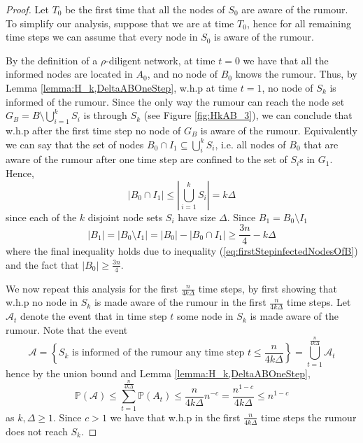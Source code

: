 
\begin{proof} 
	Let $T_0$ be the first time that all the nodes of $S_0$ are aware of the rumour. To simplify our analysis, suppose that we are at time $T_0$, hence for all remaining time steps we can assume that every node in $S_0$ is aware of the rumour. %

	By the definition of a $\rho$-diligent network, at time $t=0$  we have that all the informed nodes are located in $A_0$, and no node of $B_0$ knows the rumour. Thus, by Lemma \ref{lemma:H_k,DeltaABOneStep}, w.h.p at time $t = 1$, no node of $S_k$ is informed of the rumour. Since the only way the rumour can reach the node set $G_B = B \setminus \bigcup_{i=1}^k S_i$ is through $S_k$ (see Figure \ref{fig:HkAB_3}), we can conclude that w.h.p after the first time step no node of $G_B$ is aware of the rumour. Equivalently we can say that the set of nodes $B_0 \cap I_1 \subseteq \bigcup_i^k S_i$, i.e. all nodes of $B_0$ that are aware of the rumour after one time step are confined to the set of $S_i$s in $G_1$. Hence, 
	\begin{equation}\label{eq:firstStepinfectedNodesOfB}
		|B_0 \cap I_1| \leq \left|\bigcup_{i=1}^k S_i\right| = k\Delta
	\end{equation}
	since each of the $k$ disjoint node sets $S_i$ have size $\Delta$. Since $B_1 = B_0 \setminus I_1$
	$$
		|B_1| = |B_0 \setminus I_1| = |B_0| - |B_0 \cap I_1| \geq \frac{3n}{4} - k\Delta
	$$ %
	where the final inequality holds due to inequality (\ref{eq:firstStepinfectedNodesOfB}) and the fact that $|B_0| \geq \frac{3n}{4}$. 

	We now repeat this analysis for the first $\frac{n}{4k\Delta}$ time steps, by first showing that w.h.p no node in $S_k$ is made aware of the rumour in the first $\frac{n}{4k\Delta}$ time steps. Let $\mathcal{A}_t$ denote the event that in time step $t$ some node in $S_k$ is made aware of the rumour. Note that the event 
	$$\mathcal{A} = \left\{S_k \text{ is informed of the rumour any time step } t \leq \frac{n}{4k\Delta} \right\} = \bigcup_{t=1}^\frac{n}{4k\Delta} \mathcal{A}_t
	$$
	hence by the union bound and Lemma \ref{lemma:H_k,DeltaABOneStep},
	$$
		\mathbb{P}(\mathcal{A}) 
		\leq \sum_{t=1}^\frac{n}{4k\Delta} \mathbb{P}(A_t) 
		\leq \frac{n}{4k\Delta}n^{-c}
		= \frac{n^{1-c}}{4k\Delta} \leq n^{1-c}
	$$
	as $k, \Delta \geq 1$. Since $c > 1$ %
	we have that w.h.p in the first $\frac{n}{4k\Delta}$ time steps the rumour does not reach $S_k$. 


\end{proof}
